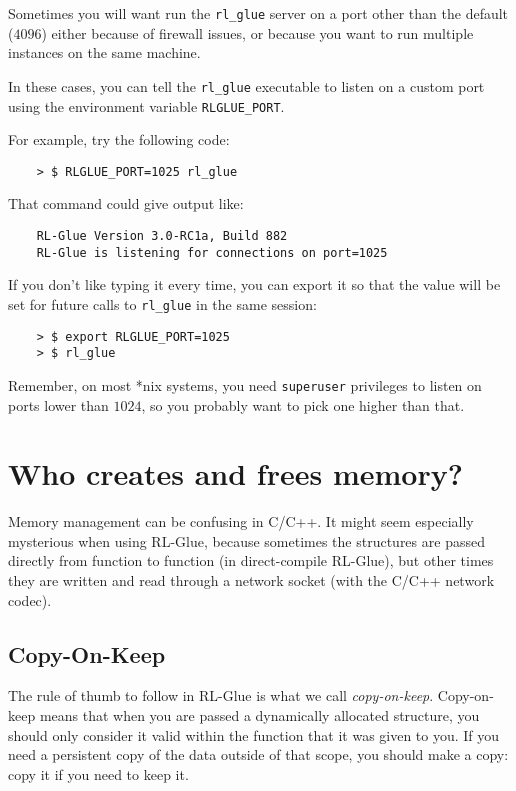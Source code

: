 \documentclass[11pt]{article}
\begin{document}
Sometimes you will want run the \texttt{rl\_glue} server on a port other than the default
($4096$) either because of firewall issues, or because you want to run multiple instances on the same machine.

In these cases, you can tell the \texttt{rl\_glue} executable to listen on a custom port using the environment variable \texttt{RLGLUE\_PORT}.

For example, try the following code:
\begin{verbatim}
	> $ RLGLUE_PORT=1025 rl_glue
\end{verbatim}

That command could give output like:
\begin{verbatim}
	RL-Glue Version 3.0-RC1a, Build 882
	RL-Glue is listening for connections on port=1025
\end{verbatim}

If you don't like typing it every time, you can export it so that the value will be set for future
calls to \texttt{rl\_glue} in the same session:
\begin{verbatim}
	> $ export RLGLUE_PORT=1025
	> $ rl_glue 
\end{verbatim}

Remember, on most *nix systems, you need \texttt{superuser} privileges to listen on ports lower than $1024$, so you probably want to pick one higher than that.


\section{Who creates and frees memory?}
Memory management can be confusing in C/C++.  It might seem especially mysterious when using RL-Glue, because sometimes the structures are passed directly 
from function to function (in direct-compile RL-Glue), but other times they are written and read through a network socket (with the C/C++ network codec).

\subsection{Copy-On-Keep}
The rule of thumb to follow in RL-Glue is what we call \textit{copy-on-keep}.  Copy-on-keep means that when you are passed a dynamically allocated structure, you should
only consider it valid within the function that it was given to you.  If you need a persistent copy of the data outside of that scope, you should make a copy: copy it if you
need to keep it.
\end{document}
